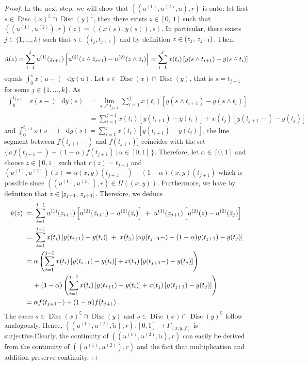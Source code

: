 \documentclass[11pt]{article}
\theoremstyle{definition}\newtheorem{example}[theorem]{Example}
\theoremstyle{definition}\newtheorem{counterexample}[theorem]{Counterexample}
\theoremstyle{definition}\newtheorem{remark}[theorem]{Remark}
\theoremstyle{definition}\newtheorem{defi}[theorem]{Definition}
\numberwithin{equation}{section}
\newcommand{\ubar}[1]{\underaccent{\bar}{#1}}
\newcommand*\diff{\mathop{}\!\mathrm{d}}								%
\renewcommand{\|}{\; : \, \;}											%
\begin{document}
\begin{proof}
	
	In the next step, we will show that $((u^{(1)}, u^{(2)}, \tilde{u}),r )$ is onto: let first $s \in \operatorname{Disc}(x)^\complement \cap \operatorname{Disc}(y)^\complement$, then there exists $z \in [0,\,1]$ such that $((u^{(1)},u^{(2)}),r) (z) = ((x(s),y(s)),s)$. In particular, there exists $j \in \{1,...,k\}$ such that $s \in (t_j, t_{j+1})$ and by definition $z \in (\Bar{z}_j,\, \ubar{z}_{j+1})$. Then,
	\[
		 \tilde{u}(z)=\sum_{i=1}^j u^{(1)}(\ubar{z}_{i+1})  \left[u^{(2)}(z \wedge \bar{z}_{i+1}) - u^{(2)}(z \wedge \bar{z}_{i})\right] = \sum_{i=1}^j x(t_i) \left[y(s \wedge t_{i+1}) - y(s \wedge t_{i})\right]
	\]
	equals $\int_0^s x(u-)\, \diff y(u)$. Let $s \in \operatorname{Disc}(x) \cap \operatorname{Disc}(y)$, that is $s = t_{j+1}$ for some $j \in \{1,\ldots,k\}$. As
	\begin{align*}
		\int_0^{t_{j+1}-}x(s-)\, \diff y(s) &= \lim_{s \nearrow t_{j+1}} \sum_{i=1}^j x(t_i) \left[y(s \wedge t_{i+1}) - y(s \wedge t_{i})\right] \\
		&= \sum_{i=1}^{j-1} x(t_i)  \left[y(t_{i+1}) - y(t_{i})\right] + x(t_j)  \left[y(t_{j+1}-) - y(t_{j})\right] 
	\end{align*}
	and $\int_0^{t_{j+1}}x(s-)\, \diff y(s) = \sum_{i=1}^{j} x(t_i) [y(t_{i+1}) - y(t_{i})]$, the line segment between $f(t_{j+1}-)$ and $f(t_{j+1})]$ coincides with the set $\{\, \alpha f(t_{j+1}-) + (1-\alpha)f(t_{j+1})  \, | \,  \alpha \in [0,1] \,\}$. Therefore, let $\alpha \in [0,1]$ and choose $z \in [0,1]$ such that $r(z) = t_{j+1}$ and $(u^{(1)},u^{(2)})(z) = \alpha (x,y)(t_{j+1}-) + (1 - \alpha) (x,y)(t_{j+1})$ which is possible since $((u^{(1)},u^{(2)}),r) \in \Pi((x,y))$. Furthermore, we have by definition that $z \in [\ubar{z}_{j+1},\, \bar{z}_{j+1}]$. Therefore, we deduce
	\begin{align*}
		\tilde{u}(z) \; &= \; \sum_{i=1}^{j-1} u^{(1)}(\ubar{z}_{i+1}) \left[u^{(2)}(\bar{z}_{i+1}) - u^{(2)}( \bar{z}_{i})\right] \; + \; u^{(1)}(\ubar{z}_{j+1}) \left[u^{(2)}(z) - u^{(2)}( \bar{z}_{j})\right] \\
		&= \; \sum_{i=1}^{j-1} x(t_i)  \left[y(t_{i+1}) - y(t_{i})\right] \; + \;  x(t_j)  \left[\alpha y(t_{j+1}-) + (1 - \alpha) y(t_{j+1}) - y(t_{j})\right] \\
		&= \alpha  \left(\sum_{i=1}^{j-1} x(t_i)  \left[y(t_{i+1}) - y(t_{i})\right] + x(t_j) \left[y(t_{j+1}-) - y(t_{j})\right]\right) \\
		& \quad \, + (1-\alpha) \left(\sum_{i=1}^{j-1} x(t_i)  \left[y(t_{i+1}) - y(t_{i})\right] + x(t_j)  \left[y(t_{j+1}) - y(t_{j})\right]\right) \\
		&= \alpha f(t_{j+1}-) + (1-\alpha)f(t_{j+1})\, .
	\end{align*}
	The cases $s \in \operatorname{Disc}(x)^\complement \cap \operatorname{Disc}(y)$ and $s \in \operatorname{Disc}(x) \cap \operatorname{Disc}(y)^\complement$ follow analogously. Hence, $((u^{(1)}, u^{(2)},\tilde{u}),r): [0,1] \to \Gamma_{(x,y,f)}$ is surjective.Clearly, the continuity of $((u^{(1)}, u^{(2)},\tilde{u}),r)$ can easily be derived from the continuity of $((u^{(1)}, u^{(2)}), r)$ and the fact that multiplication and addition preserve continuity. 
	

\end{proof}
\end{document}
